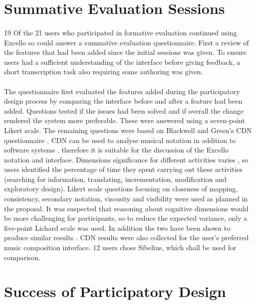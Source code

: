 \section{Summative Evaluation Sessions}

\paragraph{} 19 Of the 21 users who participated in formative evaluation continued using Excello so could answer a summative evaluation questionnaire. First a review of the features that had been added since the initial sessions was given. To ensure users had a sufficient understanding of the interface before giving feedback, a short transcription task also requiring some authoring was given.

\paragraph{} The questionnaire first evaluated the features added during the participatory design process by comparing the interface before and after a feature had been added. Questions tested if the issues had been solved and if overall the change rendered the system more preferable. These were answered using a seven-point Likert scale. The remaining questions were based on Blackwell and Green's CDN questionnaire \cite{blackwell:questionnaire}. CDN can be used to analyse musical notation \cite{blackwell:notation} in addition to software systems \cite{green:cdn}, therefore it is suitable for the discussion of the Excello notation and interface. Dimensions significance for different activities varies \cite{blackwell:tutorial}, so users identified the percentage of time they spent carrying out these activities (searching for information, translating, incrementation, modification and exploratory design). Likert scale questions focusing on closeness of mapping, consistency, secondary notation, viscosity and visibility were used as planned in the proposal. It was suspected that reasoning about cognitive dimensions would be more challenging for participants, so to reduce the expected variance, only a five-point Lichard scale was used. In addition the two have been shown to produce similar results \cite{dawes:points}. CDN results were also collected for the user's preferred music composition interface. 12 users chose Sibelius, which shall be used for comparison.

\section{Success of Participatory Design}

